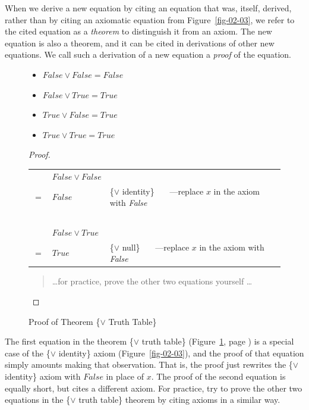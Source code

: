 When we derive a new equation by citing an equation that was,
itself, derived, rather than by citing an axiomatic equation
from Figure~\ref{fig-02-03},
we refer to the cited equation as a \emph{theorem} to
distinguish it from an axiom.
The new equation is also a theorem,
and it can be cited in derivations of other new equations.
We call such a derivation of a new equation a
\emph{proof} of the equation.

\begin{figure}
\begin{theorem}
\mbox{}
\begin{itemize}
\item $False \vee False = False$
\item $False \vee True  = True$
\item $True  \vee False = True$
\item $True  \vee True  = True$
\end{itemize}
\end{theorem}

\begin{proof}
\mbox{}\\
\begin{tabular}{lll}
    &$False \vee False$    & \\
$=$ & $False$              & \{$\vee$ identity\}  ~~~---replace $x$ in the axiom with \emph{False}\\
    &  ~                   & \\
    & $False \vee True$    & \\
$=$ & $True$               & \{$\vee$ null\}  ~~~---replace $x$ in the axiom with \emph{False}\\
\end{tabular}
\begin{quote}
\dots for practice, prove the other two equations yourself \dots
\end{quote}
\end{proof}
\caption{Proof of Theorem \{$\vee$ Truth Table\}}
\label{or-truth-table}
\end{figure}

The first equation in the theorem \{$\vee$ truth table\}
(Figure~\ref{or-truth-table}, page \pageref{or-truth-table})
is a special case of the
\{$\vee$ identity\} axiom (Figure~\ref{fig-02-03}),
and the proof of that equation simply amounts making that observation.
That is, the proof just rewrites the \{$\vee$ identity\} axiom
with $False$ in place of $x$.
The proof of the second equation is equally short, but cites
a different axiom.
For practice, try to prove the other two
equations in the \{$\vee$ truth table\} theorem
by citing axioms in a similar way.

